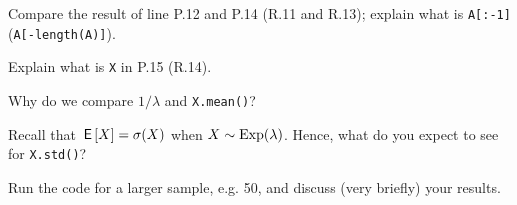 \begin{exercise}
Compare the result of  line P.12 and P.14 (R.11 and R.13);  explain what is \texttt{A[:-1]} (\texttt{A[-length(A)]}).
\end{exercise}

\begin{exercise}
 Explain what is \texttt{X} in P.15 (R.14).
\end{exercise}

\begin{exercise}
Why do we compare $1/\lambda$ and \texttt{X.mean()}?
\end{exercise}

\begin{exercise}
Recall that $\,\mathsf{E}\left[X\right] = \sigma (X)$ when $X\sim \mathrm{Exp}(\lambda)$.
Hence, what do you expect to see for \texttt{X.std()}?
\end{exercise}

\begin{exercise}
 Run the code for a larger sample, e.g. 50, and discuss (very briefly) your results.
\end{exercise}


